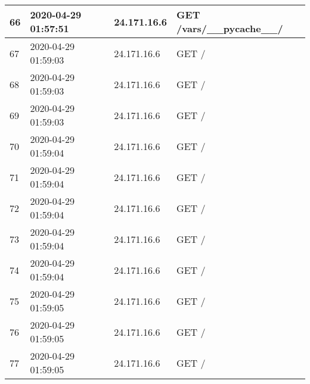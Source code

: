 \documentclass[12pt]{article}
\begin{document}
\begin{longtable}{|l|l|l|l|}
66  & 2020-04-29 01:57:51 & 24.171.16.6     & GET /vars/\_\_pycache\_\_/                                                                                                          \\ \hline
67  & 2020-04-29 01:59:03 & 24.171.16.6     & GET /                                                                                                                               \\ \hline
68  & 2020-04-29 01:59:03 & 24.171.16.6     & GET /                                                                                                                               \\ \hline
69  & 2020-04-29 01:59:03 & 24.171.16.6     & GET /                                                                                                                               \\ \hline
70  & 2020-04-29 01:59:04 & 24.171.16.6     & GET /                                                                                                                               \\ \hline
71  & 2020-04-29 01:59:04 & 24.171.16.6     & GET /                                                                                                                               \\ \hline
72  & 2020-04-29 01:59:04 & 24.171.16.6     & GET /                                                                                                                               \\ \hline
73  & 2020-04-29 01:59:04 & 24.171.16.6     & GET /                                                                                                                               \\ \hline
74  & 2020-04-29 01:59:04 & 24.171.16.6     & GET /                                                                                                                               \\ \hline
75  & 2020-04-29 01:59:05 & 24.171.16.6     & GET /                                                                                                                               \\ \hline
76  & 2020-04-29 01:59:05 & 24.171.16.6     & GET /                                                                                                                               \\ \hline
77  & 2020-04-29 01:59:05 & 24.171.16.6     & GET /                                                                                                                               \\ \hline

\end{longtable}
\end{document}
